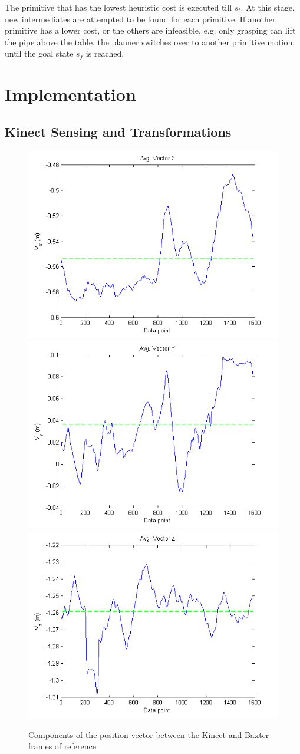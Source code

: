 \documentclass[runningheads,letterpaper]{llncs}
\begin{document}
The primitive that has the lowest heuristic cost is executed till $s_t$. At this stage, new intermediates are attempted to be found for each primitive. If another primitive has a lower cost, or the others are infeasible, e.g. only grasping can lift the pipe above the table, the planner switches over to another primitive motion, until the goal state $s_f$ is reached.


\section{Implementation}

\subsection{Kinect Sensing and Transformations}

\begin{figure}[ht]
\centering
	\includegraphics[height=0.3\columnwidth]{images/vec_avg_x.png}
	\includegraphics[height=0.3\columnwidth]{images/vec_avg_y.png}
	\includegraphics[height=0.3\columnwidth]{images/vec_avg_z.png}
\caption{Components of the position vector between the Kinect and Baxter frames of reference}
\label{fig:kinect_to_baxter}
\end{figure}
\end{document}
